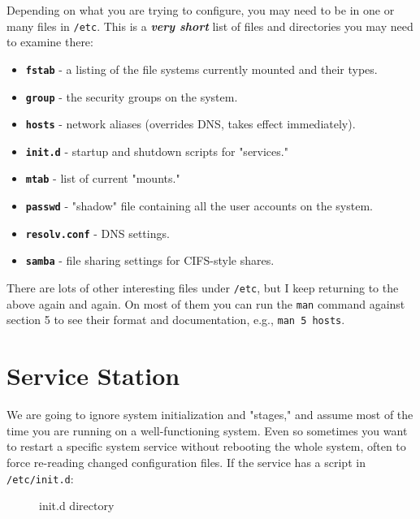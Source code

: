 \documentclass[10pt,american,]{book}
\numberwithin{figure}{chapter}
\DeclareRobustCommand{\drcap}[1]{\begin{figure}[H]\caption{#1}\end{figure}}
\begin{document}
Depending on what you are trying to configure, you may need to be in one
or many files in \texttt{/etc}. This is a \textbf{\emph{very short}}
list of files and directories you may need to examine there:

\begin{itemize}
\item
  \textbf{\texttt{fstab}} - a listing of the file systems
  currently mounted and their types.
\item
  \textbf{\texttt{group}} - the security groups on the
  system.
\item
  \textbf{\texttt{hosts}} - network aliases (overrides DNS,
  takes effect immediately).
\item
  \textbf{\texttt{init.d}} - startup and shutdown scripts
  for "services."
\item
  \textbf{\texttt{mtab}} - list of current "mounts."
\item
  \textbf{\texttt{passwd}} - "shadow" file containing all
  the user accounts on the system.
\item
  \textbf{\texttt{resolv.conf}} - DNS settings.
\item
  \textbf{\texttt{samba}} - file sharing settings for
  CIFS-style shares.
\end{itemize}

There are lots of other interesting files under \texttt{/etc}, but I
keep returning to the above again and again. On most of them you can run
the \texttt{man} command against section 5 to see their format and
documentation, e.g., \texttt{man\ 5\ hosts}.

\section*{Service Station}\label{service-station}

We are going to ignore system initialization and "stages," and assume
most of the time you are running on a well-functioning system. Even so
sometimes you want to restart a specific system service without
rebooting the whole system, often to force re-reading changed
configuration files. If the service has a script in
\texttt{/etc/init.d}:

\drcap{init.d directory}
\end{document}

